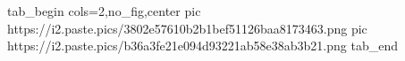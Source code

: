  
 
 
 
 


\ifcmt
  tab_begin cols=2,no_fig,center
     pic https://i2.paste.pics/3802e57610b2b1bef51126baa8173463.png
		 pic https://i2.paste.pics/b36a3fe21e094d93221ab58e38ab3b21.png
  tab_end
\fi
